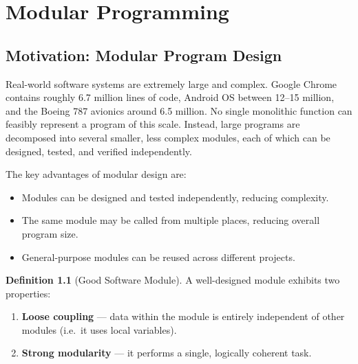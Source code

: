 \documentclass[11pt, a4paper, notitlepage]{report}
\theoremstyle{definition}
\newtheorem{definition}[theorem]{Definition}
\theoremstyle{remark}
\theoremstyle{definition}
\begin{document}
\chapter{Modular Programming}

\section{Motivation: Modular Program Design}

Real-world software systems are extremely large and complex. Google Chrome contains roughly 6.7 million lines of code, Android OS between 12--15 million, and the Boeing 787 avionics around 6.5 million. No single monolithic function can feasibly represent a program of this scale. Instead, large programs are decomposed into several smaller, less complex modules, each of which can be designed, tested, and verified independently.

The key advantages of modular design are:

\begin{itemize}
  \item Modules can be designed and tested independently, reducing complexity.
  \item The same module may be called from multiple places, reducing overall program size.
  \item General-purpose modules can be reused across different projects.
\end{itemize}

\begin{definition}[Good Software Module]
\label{def:good-module}
A well-designed module exhibits two properties:
\begin{enumerate}
  \item \textbf{Loose coupling} --- data within the module is entirely independent of other modules (i.e.\ it uses local variables).
  \item \textbf{Strong modularity} --- it performs a single, logically coherent task.
\end{enumerate}
\end{definition}
\end{document}
